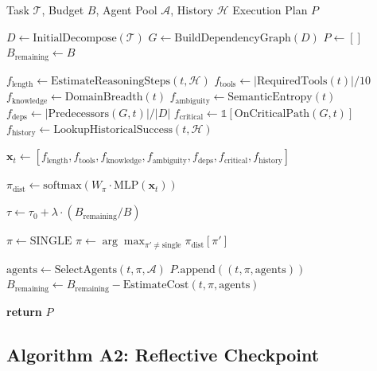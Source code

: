 \documentclass{article}
\theoremstyle{plain}
\theoremstyle{definition}
\theoremstyle{remark}
\begin{document}
\begin{algorithm}[H]
	\caption{Complexity-Aware Routing (\car{})}
	\label{alg:car_detailed}
	\begin{algorithmic}[1]
		\REQUIRE Task $\mathcal{T}$, Budget $B$, Agent Pool $\mathcal{A}$, History $\mathcal{H}$
		\ENSURE Execution Plan $P$
		
		\STATE $D \leftarrow \text{InitialDecompose}(\mathcal{T})$ 
		\STATE $G \leftarrow \text{BuildDependencyGraph}(D)$
		\STATE $P \leftarrow []$
		\STATE $B_{\text{remaining}} \leftarrow B$
		
		\STATE {}
		\STATE $f_{\text{length}} \leftarrow \text{EstimateReasoningSteps}(t, \mathcal{H})$
		\STATE $f_{\text{tools}} \leftarrow |\text{RequiredTools}(t)| / 10$
		\STATE $f_{\text{knowledge}} \leftarrow \text{DomainBreadth}(t)$
		\STATE $f_{\text{ambiguity}} \leftarrow \text{SemanticEntropy}(t)$
		\STATE $f_{\text{deps}} \leftarrow |\text{Predecessors}(G, t)| / |D|$
		\STATE $f_{\text{critical}} \leftarrow \mathbb{1}[\text{OnCriticalPath}(G, t)]$
		\STATE $f_{\text{history}} \leftarrow \text{LookupHistoricalSuccess}(t, \mathcal{H})$
		
		\STATE $\mathbf{x}_t \leftarrow [f_{\text{length}}, f_{\text{tools}}, f_{\text{knowledge}}, f_{\text{ambiguity}}, f_{\text{deps}}, f_{\text{critical}}, f_{\text{history}}]$
		
		\STATE {}
		\STATE $\pi_{\text{dist}} \leftarrow \text{softmax}(W_\pi \cdot \text{MLP}(\mathbf{x}_t))$
		
		\STATE {}
		\STATE $\tau \leftarrow \tau_0 + \lambda \cdot (B_{\text{remaining}} / B)$
		
		\STATE $\pi \leftarrow \text{SINGLE}$
		\ELSE
		\STATE $\pi \leftarrow \arg\max_{\pi' \neq \text{single}} \pi_{\text{dist}}[\pi']$
		\ENDIF
		
		\STATE $\text{agents} \leftarrow \text{SelectAgents}(t, \pi, \mathcal{A})$
		\STATE $P.\text{append}((t, \pi, \text{agents}))$
		\STATE $B_{\text{remaining}} \leftarrow B_{\text{remaining}} - \text{EstimateCost}(t, \pi, \text{agents})$
		\ENDFOR
		
		\STATE \textbf{return} $P$
	\end{algorithmic}
\end{algorithm}

\subsection{Algorithm A2: Reflective Checkpoint}
\end{document}
